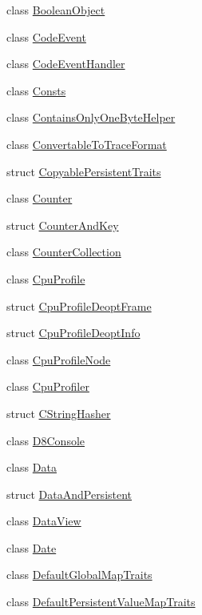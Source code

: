\begin{DoxyCompactItemize}
class \mbox{\hyperlink{classv8_1_1BooleanObject}{Boolean\+Object}}
\item 
class \mbox{\hyperlink{classv8_1_1CodeEvent}{Code\+Event}}
\item 
class \mbox{\hyperlink{classv8_1_1CodeEventHandler}{Code\+Event\+Handler}}
\item 
class \mbox{\hyperlink{classv8_1_1Consts}{Consts}}
\item 
class \mbox{\hyperlink{classv8_1_1ContainsOnlyOneByteHelper}{Contains\+Only\+One\+Byte\+Helper}}
\item 
class \mbox{\hyperlink{classv8_1_1ConvertableToTraceFormat}{Convertable\+To\+Trace\+Format}}
\item 
struct \mbox{\hyperlink{structv8_1_1CopyablePersistentTraits}{Copyable\+Persistent\+Traits}}
\item 
class \mbox{\hyperlink{classv8_1_1Counter}{Counter}}
\item 
struct \mbox{\hyperlink{structv8_1_1CounterAndKey}{Counter\+And\+Key}}
\item 
class \mbox{\hyperlink{classv8_1_1CounterCollection}{Counter\+Collection}}
\item 
class \mbox{\hyperlink{classv8_1_1CpuProfile}{Cpu\+Profile}}
\item 
struct \mbox{\hyperlink{structv8_1_1CpuProfileDeoptFrame}{Cpu\+Profile\+Deopt\+Frame}}
\item 
struct \mbox{\hyperlink{structv8_1_1CpuProfileDeoptInfo}{Cpu\+Profile\+Deopt\+Info}}
\item 
class \mbox{\hyperlink{classv8_1_1CpuProfileNode}{Cpu\+Profile\+Node}}
\item 
class \mbox{\hyperlink{classv8_1_1CpuProfiler}{Cpu\+Profiler}}
\item 
struct \mbox{\hyperlink{structv8_1_1CStringHasher}{C\+String\+Hasher}}
\item 
class \mbox{\hyperlink{classv8_1_1D8Console}{D8\+Console}}
\item 
class \mbox{\hyperlink{classv8_1_1Data}{Data}}
\item 
struct \mbox{\hyperlink{structv8_1_1DataAndPersistent}{Data\+And\+Persistent}}
\item 
class \mbox{\hyperlink{classv8_1_1DataView}{Data\+View}}
\item 
class \mbox{\hyperlink{classv8_1_1Date}{Date}}
\item 
class \mbox{\hyperlink{classv8_1_1DefaultGlobalMapTraits}{Default\+Global\+Map\+Traits}}
\item 
class \mbox{\hyperlink{classv8_1_1DefaultPersistentValueMapTraits}{Default\+Persistent\+Value\+Map\+Traits}}

\end{DoxyCompactItemize}
